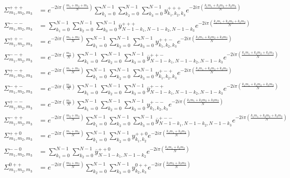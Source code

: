 \begin{align*}
\Sigma_{m_1,m_2,m_3}^{+++}&=
  e^{-2i\pi\left(\frac{m_1+m_2+m_3}{N}\right)} \sum_{k_1=0}^{N-1}\sum_{k_2=0}^{N-1}\sum_{k_3=0}^{N-1} y^{+++}_{k_1,k_2,k_3} e^{-2i\pi\left(\frac{k_1m_1+k_2m_2+k_3m_3}{N}\right)} \\
\Sigma_{m_1,m_2,m_3}^{---}&=
  \sum_{k_1=0}^{N-1}\sum_{k_2=0}^{N-1}\sum_{k_3=0}^{N-1} \overline{y}^{+++}_{N-1-k_1,N-1-k_2,N-1-k_3} e^{-2i\pi\left(\frac{k_1m_1+k_2m_2+k_3m_3}{N}\right)} \\
\Sigma_{m_1,m_2,m_3}^{++-}&=
  e^{-2i\pi\left(\frac{m_1+m_2}{N}\right)} \sum_{k_1=0}^{N-1}\sum_{k_2=0}^{N-1}\sum_{k_3=0}^{N-1} y^{++-}_{k_1,k_2,k_3} e^{-2i\pi\left(\frac{k_1m_1+k_2m_2+k_3m_3}{N}\right)} \\
\Sigma_{m_1,m_2,m_3}^{--+}&=
  e^{-2i\pi\left(\frac{m_3}{N}\right)} \sum_{k_1=0}^{N-1}\sum_{k_2=0}^{N-1}\sum_{k_3=0}^{N-1} \overline{y}^{++-}_{N-1-k_1,N-1-k_2,N-1-k_3} e^{-2i\pi\left(\frac{k_1m_1+k_2m_2+k_3m_3}{N}\right)} \\
\Sigma_{m_1,m_2,m_3}^{+-+}&=
  e^{-2i\pi\left(\frac{m_1+m_3}{N}\right)} \sum_{k_1=0}^{N-1}\sum_{k_2=0}^{N-1}\sum_{k_3=0}^{N-1} y^{+-+}_{k_1,k_2,k_3} e^{-2i\pi\left(\frac{k_1m_1+k_2m_2+k_3m_3}{N}\right)} \\
\Sigma_{m_1,m_2,m_3}^{-+-}&=
  e^{-2i\pi\left(\frac{m_2}{N}\right)} \sum_{k_1=0}^{N-1}\sum_{k_2=0}^{N-1}\sum_{k_3=0}^{N-1} \overline{y}^{+-+}_{N-1-k_1,N-1-k_2,N-1-k_3} e^{-2i\pi\left(\frac{k_1m_1+k_2m_2+k_3m_3}{N}\right)} \\
\Sigma_{m_1,m_2,m_3}^{+--}&=
  e^{-2i\pi\left(\frac{m_1}{N}\right)} \sum_{k_1=0}^{N-1}\sum_{k_2=0}^{N-1}\sum_{k_3=0}^{N-1} y^{+--}_{k_1,k_2,k_3} e^{-2i\pi\left(\frac{k_1m_1+k_2m_2+k_3m_3}{N}\right)} \\
\Sigma_{m_1,m_2,m_3}^{-++}&=
  e^{-2i\pi\left(\frac{m_2+m_3}{N}\right)} \sum_{k_1=0}^{N-1}\sum_{k_2=0}^{N-1}\sum_{k_3=0}^{N-1} \overline{y}^{+--}_{N-1-k_1,N-1-k_2,N-1-k_3} e^{-2i\pi\left(\frac{k_1m_1+k_2m_2+k_3m_3}{N}\right)} \\
\Sigma_{m_1,m_2,m_3}^{++0}&=
  e^{-2i\pi\left(\frac{m_1+m_2}{N}\right)} \sum_{k_1=0}^{N-1}\sum_{k_2=0}^{N-1} y^{++0}_{k_1,k_2} e^{-2i\pi\left(\frac{k_1m_1+k_2m_2}{N}\right)} \\
\Sigma_{m_1,m_2,m_3}^{--0}&=
  \sum_{k_1=0}^{N-1}\sum_{k_2=0}^{N-1} \overline{y}^{++0}_{N-1-k_1,N-1-k_2} e^{-2i\pi\left(\frac{k_1m_1+k_2m_2}{N}\right)} \\
\Sigma_{m_1,m_2,m_3}^{0++}&=
  e^{-2i\pi\left(\frac{m_2+m_3}{N}\right)} \sum_{k_2=0}^{N-1}\sum_{k_3=0}^{N-1} y^{0++}_{k_2,k_3} e^{-2i\pi\left(\frac{k_2m_2+k_3m_3}{N}\right)} \\

\end{align*}
